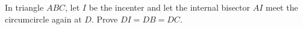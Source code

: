 In triangle $ABC$, let $I$ be the incenter and let the internal bisector $AI$ meet the circumcircle again at $D$. Prove $DI=DB=DC$.
